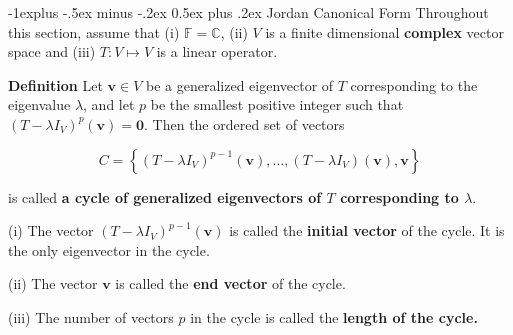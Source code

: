 \documentclass[10pt,landscape]{article}
\makeatletter
\renewcommand{\subsection}{\@startsection{subsection}{2}{0mm}%
                                {-1explus -.5ex minus -.2ex}%
                                {0.5ex plus .2ex}%
                                {\normalfont\normalsize\bfseries}}
\makeatother
\begin{document}
\begin{multicols}{4}








\subsection{Jordan Canonical Form}
Throughout this section, assume that (i) $\mathbb{F} = \mathbb{C}$, (ii) $V$ is a finite dimensional \textbf{complex} vector space and (iii) $T : V \mapsto V$ is a linear operator.

\textbf{Definition} Let $\mathbf{v} \in V$ be a generalized eigenvector of $T$ corresponding to the eigenvalue $\lambda$, and let $p$ be the smallest positive integer such that $(T - \lambda I_V)^p (\mathbf{v}) = \mathbf{0}$. Then the ordered set of vectors

$$
C=\left\{\left(T-\lambda I_{V}\right)^{p-1}(\mathbf{v}), \ldots,\left(T-\lambda I_{V}\right)(\mathbf{v}), \mathbf{v}\right\}
$$

is called \textbf{a cycle of generalized eigenvectors of $T$ corresponding to $\lambda$}.

(i) The vector $(T - \lambda I_V)^{p - 1} (\mathbf{v})$ is called the \textbf{initial vector} of the cycle. It is the only eigenvector in the cycle.

(ii) The vector $\mathbf{v}$ is called the \textbf{end vector} of the cycle.

(iii) The number of vectors $p$ in the cycle is called the \textbf{length of the cycle.}


\end{multicols}
\end{document}
